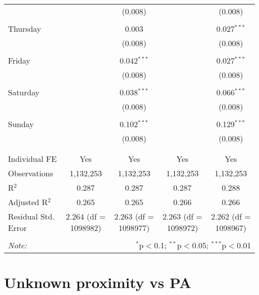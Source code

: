 \documentclass[
]{article}
\begin{document}
\begin{table}[!htbp]
{\begin{tabular}{@{\extracolsep{5pt}}lcccc}
  &  & (0.008) &  & (0.008) \\ 
  & & & & \\ 
 Thursday &  & 0.003 &  & 0.027$^{***}$ \\ 
  &  & (0.008) &  & (0.008) \\ 
  & & & & \\ 
 Friday &  & 0.042$^{***}$ &  & 0.027$^{***}$ \\ 
  &  & (0.008) &  & (0.008) \\ 
  & & & & \\ 
 Saturday &  & 0.038$^{***}$ &  & 0.066$^{***}$ \\ 
  &  & (0.008) &  & (0.008) \\ 
  & & & & \\ 
 Sunday &  & 0.102$^{***}$ &  & 0.129$^{***}$ \\ 
  &  & (0.008) &  & (0.008) \\ 
  & & & & \\ 
\hline \\[-1.8ex] 
Individual FE & Yes & Yes & Yes & Yes \\ 
Observations & 1,132,253 & 1,132,253 & 1,132,253 & 1,132,253 \\ 
R$^{2}$ & 0.287 & 0.287 & 0.287 & 0.288 \\ 
Adjusted R$^{2}$ & 0.265 & 0.265 & 0.266 & 0.266 \\ 
Residual Std. Error & 2.264 (df = 1098982) & 2.263 (df = 1098977) & 2.263 (df = 1098972) & 2.262 (df = 1098967) \\ 
\hline 
\hline \\[-1.8ex] 
\textit{Note:}  & \multicolumn{4}{r}{$^{*}$p$<$0.1; $^{**}$p$<$0.05; $^{***}$p$<$0.01} \\ 
\end{tabular}
} 
\end{table} 
\newpage
\section{Unknown proximity vs PA}
\end{document}
